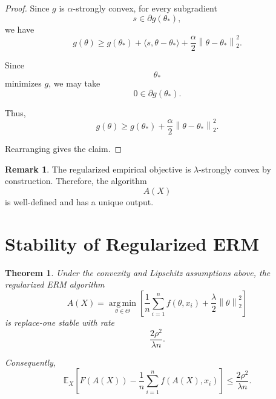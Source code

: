 \documentclass[12pt,oneside]{book}
\numberwithin{equation}{section}
\theoremstyle{definition}
\newtheorem{remark}{Remark}[section]
\theoremstyle{plain}
\newtheorem{theorem}{Theorem}[section]
\theoremstyle{remark}
\newcommand{\E}{\mathbb{E}}
\newcommand{\argmin}{\operatorname*{arg\,min}}
\newcommand{\norm}[1]{\left\lVert #1 \right\rVert}
\begin{document}
\begin{proof}
Since $g$ is $\alpha$-strongly convex, for every subgradient
\[
s\in\partial g(\theta_*),
\]
we have
\[
g(\theta)
\geq
g(\theta_*)
+
\langle s,\theta-\theta_*\rangle
+
\frac{\alpha}{2}\norm{\theta-\theta_*}_2^2.
\]

Since
\[
\theta_*
\]
minimizes $g$, we may take
\[
0\in\partial g(\theta_*).
\]

Thus,
\[
g(\theta)
\geq
g(\theta_*)
+
\frac{\alpha}{2}\norm{\theta-\theta_*}_2^2.
\]

Rearranging gives the claim.
\end{proof}

\begin{remark}
The regularized empirical objective is $\lambda$-strongly convex by construction. Therefore, the algorithm
\[
A(X)
\]
is well-defined and has a unique output.
\end{remark}

\section{Stability of Regularized ERM}

\begin{theorem}
Under the convexity and Lipschitz assumptions above, the regularized ERM algorithm
\[
A(X)
=
\argmin_{\theta\in\Theta}
\left[
\frac{1}{n}\sum_{i=1}^n f(\theta,x_i)
+
\frac{\lambda}{2}\norm{\theta}_2^2
\right]
\]
is replace-one stable with rate
\[
\frac{2\rho^2}{\lambda n}.
\]

Consequently,
\[
\E_X
\left[
F(A(X))
-
\frac{1}{n}\sum_{i=1}^n f(A(X),x_i)
\right]
\leq
\frac{2\rho^2}{\lambda n}.
\]
\end{theorem}
\end{document}
